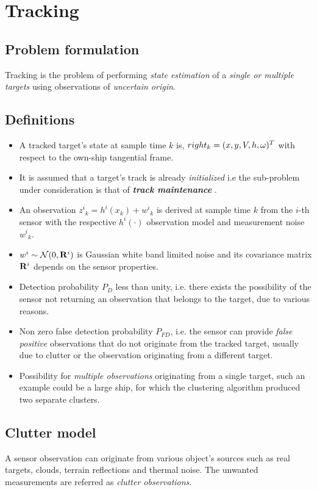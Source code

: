 \chapter{Tracking}

\section{Problem formulation}

Tracking is the problem of performing \emph{state estimation} of a \emph{single or multiple targets} using observations of \emph{uncertain origin}.

\section{Definitions}

\begin{itemize}
	\item A tracked target's state at sample time $k$ is, $\\right _k=(x,y,V,h,\omega)^T$ with respect to the own-ship tangential frame.
	\item It is assumed that a target's track is already \emph{initialized} i.e the sub-problem under consideration is that of \emph{\textbf{track maintenance}} .
	\item An observation ${z^i}_k = h^i(x_k) + {w^i}_k$ is derived at sample time $k$ from the $i$-th sensor with the respective $h^i(\cdot)$ observation model and measurement noise ${w^i}_k$.
	\item $w^i \sim \mathcal{N}(0, \mathbf{R}^i)$ is Gaussian white band limited noise and its covariance matrix $\mathbf{R}^i$ depends on the sensor properties.
	\item Detection probability $P_D$ less than unity, i.e. there exists the possibility of the sensor not returning an observation that belongs to the target, due to various reasons.
	\item Non zero false detection probability $P_{FD}$, i.e. the sensor can provide  \emph{false positive} observations that do not originate from the tracked target, usually due to clutter or the observation originating from a different target.
	\item Possibility for \emph{multiple observations} originating from a single target, such an example could be a large ship, for which the clustering algorithm produced two separate clusters.
\end{itemize}

\section{Clutter model}
A sensor observation can originate from various object's sources such as real targets, clouds, terrain reflections and thermal noise. The unwanted measurements are referred as \emph{clutter observations}\cite{Memon2020}.


